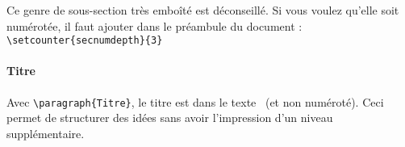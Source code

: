 Ce genre de sous-section très emboîté est déconseillé.
Si vous voulez qu'elle soit numérotée, il faut ajouter dans le
préambule du document :
\verb|\setcounter{secnumdepth}{3}|

\paragraph{Titre}

Avec \verb/\paragraph{Titre}/, le titre est \og dans le texte \fg\ (et non
numéroté).  Ceci permet de structurer des idées sans avoir
l'impression d'un niveau supplémentaire.


\endinput
